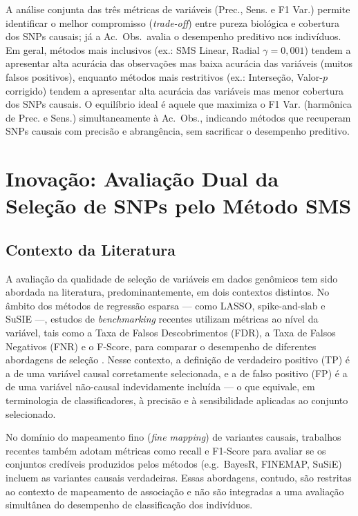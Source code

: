 \documentclass[
    12pt,
    a4paper,
    oneside,
    english,
    french,
    spanish,
    brazil
    ]{abntex2}
\newcommand{\novo}[1]{\textcolor{corNova}{#1}}
\begin{document}
\novo{A análise conjunta das três métricas de variáveis (Prec., Sens. e F1 Var.) permite identificar o melhor compromisso (\textit{trade-off}) entre pureza biológica e cobertura dos SNPs causais; já a Ac.\ Obs.\ avalia o desempenho preditivo nos indivíduos. Em geral, métodos mais inclusivos (ex.: SMS Linear, Radial $\gamma = 0{,}001$) tendem a apresentar alta acurácia das observações mas baixa acurácia das variáveis (muitos falsos positivos), enquanto métodos mais restritivos (ex.: Interseção, Valor-$p$ corrigido) tendem a apresentar alta acurácia das variáveis mas menor cobertura dos SNPs causais. O equilíbrio ideal é aquele que maximiza o F1 Var. (harmônica de Prec. e Sens.) simultaneamente à Ac.\ Obs., indicando métodos que recuperam SNPs causais com precisão e abrangência, sem sacrificar o desempenho preditivo.}

\section*{Inovação: Avaliação Dual da Seleção de SNPs pelo Método SMS}

\subsection*{Contexto da Literatura}

\novo{A avaliação da qualidade de seleção de variáveis em dados genômicos tem sido abordada na literatura, predominantemente, em dois contextos distintos. No âmbito dos métodos de regressão esparsa --- como LASSO, spike-and-slab e SuSIE \cite{tibshirani1996regression,george1993variable} ---, estudos de \textit{benchmarking} recentes utilizam métricas ao nível da variável, tais como a Taxa de Falsos Descobrimentos (FDR), a Taxa de Falsos Negativos (FNR) e o F-Score, para comparar o desempenho de diferentes abordagens de seleção \cite{Kollipara2026}. Nesse contexto, a definição de verdadeiro positivo (TP) é a de uma variável causal corretamente selecionada, e a de falso positivo (FP) é a de uma variável não-causal indevidamente incluída --- o que equivale, em terminologia de classificadores, à precisão e à sensibilidade aplicadas ao conjunto selecionado.}

\novo{No domínio do mapeamento fino (\textit{fine mapping}) de variantes causais, trabalhos recentes \cite{Shrestha2025} também adotam métricas como recall e F1-Score para avaliar se os conjuntos credíveis produzidos pelos métodos (e.g.\ BayesR, FINEMAP, SuSiE) incluem as variantes causais verdadeiras. Essas abordagens, contudo, são restritas ao contexto de mapeamento de associação e não são integradas a uma avaliação simultânea do desempenho de classificação dos indivíduos.}
\end{document}
